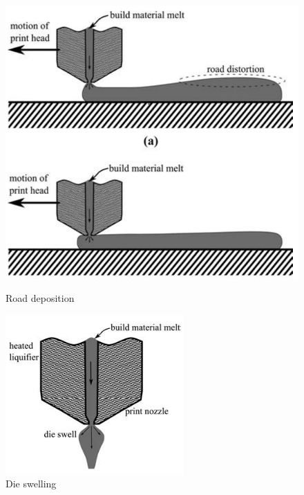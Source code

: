 
\begin{figure}[htb]
\centering
\begin{minipage}{.45\textwidth}
  \centering
    \includegraphics[width=.80\textwidth]{chapter_2/figures/Extrusion.PNG}
   \caption{Road deposition \cite{Turner2014AModeling}}
    \label{fig:Roaddepostion}
\end{minipage}%
\begin{minipage}{.45\textwidth}
  \centering
  \includegraphics[width=.80\textwidth]{chapter_2/figures/dieswelling.PNG}
    \caption{Die swelling \cite{Turner2014AModeling}}
    \label{fig:dieswelling}
\end{minipage}
\end{figure}

